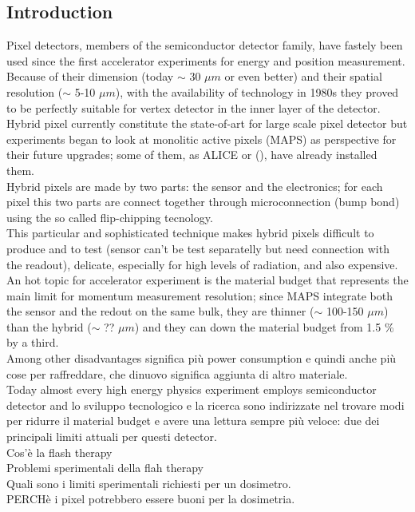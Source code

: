 \begin{titlepage}
\section{Introduction}
Pixel detectors, members of the semiconductor detector family, have fastely been used since the first 
accelerator experiments for energy and position measurement. 
Because of their dimension (today $\sim$ 30 $\mu m$ or even better) and their spatial resolution 
($\sim$ 5-10 $\mu m$), with the availability of technology in 1980s they proved to be perfectly suitable 
for vertex detector in the inner layer of the detector.\\
Hybrid pixel currently constitute the state-of-art for large scale pixel detector but experiments began 
to look at monolitic active pixels (MAPS) as perspective for their future upgrades; some of them, as ALICE or 
(), have already installed them. \\
Hybrid pixels are made by two parts: the sensor and the electronics; for each pixel this two parts are connect 
together through microconnection (bump bond) using the so called flip-chipping tecnology.\\
This particular and sophisticated technique makes hybrid pixels difficult to produce and to test (sensor can't be 
test separatelly but need connection with the readout), delicate, especially for high levels of radiation,
and also expensive. \\
An hot topic for accelerator experiment is the material budget that represents the main limit for momentum measurement
resolution; since MAPS integrate both the sensor and the redout on the same bulk, they are thinner 
($\sim$ 100-150 $\mu m$) than the hybrid ($\sim$ ?? $\mu m$) and they can down the material budget from 1.5 \% by a third.\\

Among other disadvantages significa più power consumption e quindi anche più cose per raffreddare, che dinuovo
significa aggiunta di altro materiale.\\

Today almost every high energy physics experiment employs semiconductor detector and 
lo sviluppo tecnologico e la ricerca sono indirizzate nel trovare modi per ridurre il material budget e
avere una lettura sempre più veloce: due dei principali limiti attuali per questi detector. \\

Cos'è la flash therapy\\
Problemi sperimentali della flah therapy\\
Quali sono i limiti sperimentali richiesti per un dosimetro.\\
PERCHè i pixel potrebbero essere buoni per la dosimetria.\\

\end{titlepage}
